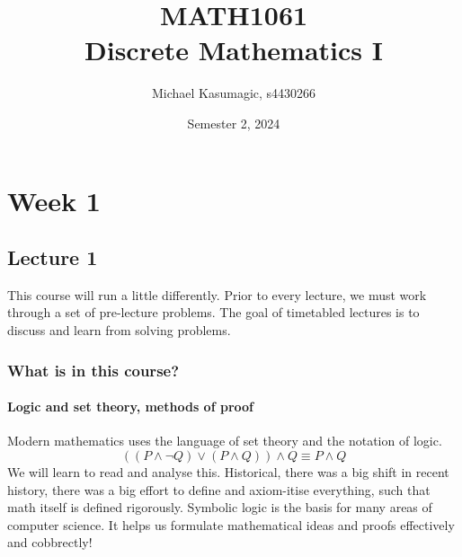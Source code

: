 \documentclass{report}
\title{\Huge{MATH1061}\\Discrete Mathematics I}
\author{\huge{Michael Kasumagic, s4430266}}
\date{\huge{Semester 2, 2024}}
\begin{document}
\maketitle
\newpage%
\tableofcontents
\pagebreak

\chapter{Week 1}
\section{Lecture 1}
This course will run a little differently. Prior to every lecture, we must work through a set of pre-lecture problems. The goal of timetabled lectures is to discuss and learn from solving problems.

\subsection*{What is in this course?}
\subsubsection*{Logic and set theory, methods of proof}
Modern mathematics uses the language of set theory and the notation of logic.
$$
((P \land \lnot Q) \lor (P\land Q)) \land Q \equiv P \land Q
$$
We will learn to read and analyse this. Historical, there was a big shift in recent history, there was a big effort to define and axiom-itise everything, such that math itself is defined rigorously. Symbolic logic is the basis for many areas of computer science. It helps us formulate mathematical ideas and proofs effectively and cobbrectly! \\

\end{document}
